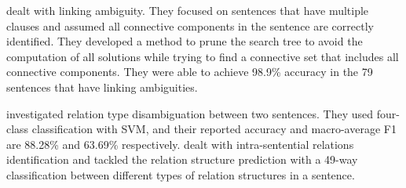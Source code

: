 \cite{hu2011research} dealt with linking ambiguity. They focused on sentences
that have multiple clauses and assumed all connective components in the sentence
are correctly identified. They developed a method to prune the search tree
to avoid the computation of all solutions while trying to find a connective
set that includes all connective components. They were able to achieve 98.9\%
accuracy in the 79 sentences that have linking ambiguities.

\cite{huang2011chinese} investigated relation type disambiguation between
two sentences. They used four-class classification with SVM, and their reported
accuracy and macro-average F1 are 88.28\% and 63.69\% respectively.
\cite{huang2012contingency} dealt with intra-sentential relations identification
and tackled the relation structure prediction with a 49-way classification
between different types of relation structures in a sentence.
